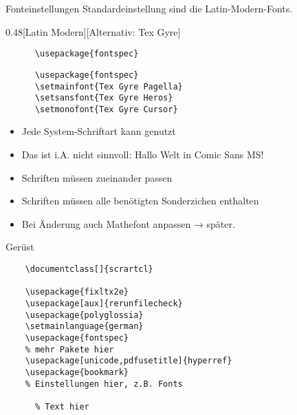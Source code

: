 \begin{frame}[fragile]{Fonteinstellungen}
  Standardeinstellung sind die Latin-Modern-Fonts.
  \vspace{1em}
  \begin{CodeExample}{0.48}[Latin Modern][Alternativ: Tex Gyre]
    \begin{lstlisting}
      \usepackage{fontspec}
    \end{lstlisting}
  \CodeResult
    \begin{lstlisting}
      \usepackage{fontspec}
      \setmainfont{Tex Gyre Pagella}
      \setsansfont{Tex Gyre Heros}
      \setmonofont{Tex Gyre Cursor}
    \end{lstlisting}
  \end{CodeExample}
  \begin{itemize}
    \item Jede System-Schriftart kann genutzt
    \item \alert{Das ist i.A. nicht sinnvoll:  Hallo Welt in Comic Sans MS!}
    \item Schriften müssen zueinander passen
    \item Schriften müssen alle benötigten Sonderzichen enthalten
    \item Bei Änderung auch Mathefont anpassen → später.
  \end{itemize}
\end{frame}

\begin{frame}[fragile]{Gerüst}
  \begin{lstlisting}
    \documentclass[]{scrartcl}

    \usepackage{fixltx2e}
    \usepackage[aux]{rerunfilecheck}
    \usepackage{polyglossia}
    \setmainlanguage{german}
    \usepackage{fontspec}
    % mehr Pakete hier
    \usepackage[unicode,pdfusetitle]{hyperref}
    \usepackage{bookmark}
    % Einstellungen hier, z.B. Fonts
    
      % Text hier
    
  \end{lstlisting}
\end{frame}

